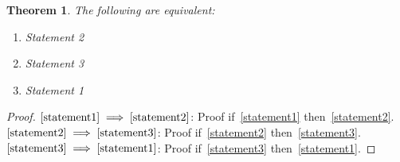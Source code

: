 \documentclass{article}
\newtheorem{theorem}{Theorem}
\newcommand{\Implies}[2]{$\text{\ref{#1}}\implies\text{\ref{#2}}$}
\begin{document}
\begin{theorem}
	The following are equivalent:
	\begin{enumerate}[label=(\arabic*),ref=(\arabic*)]
		\item Statement 2 \label{statement2}
		\item Statement 3 \label{statement3}
		\item Statement 1 \label{statement1}
	\end{enumerate}
\end{theorem}

\begin{proof}
	\Implies{statement1}{statement2}: Proof if~\ref{statement1} then~\ref{statement2}.
	\Implies{statement2}{statement3}: Proof if~\ref{statement2} then~\ref{statement3}.
	\Implies{statement3}{statement1}: Proof if~\ref{statement3} then~\ref{statement1}.
\end{proof}
\end{document}

